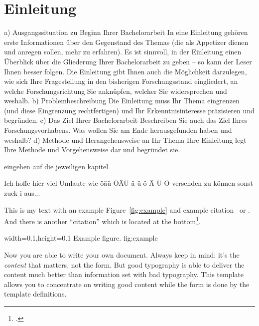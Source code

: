 
\chapter{Einleitung}

a) Ausgangssituation zu Beginn Ihrer Bachelorarbeit
In eine Einleitung gehören erste Informationen über den Gegenstand des Themas (die als Appetizer dienen und anregen sollen, mehr zu erfahren). Es ist sinnvoll, in der Einleitung einen Überblick über die Gliederung Ihrer Bachelorarbeit zu geben – so kann der Leser Ihnen besser folgen. Die Einleitung gibt Ihnen auch die Möglichkeit darzulegen, wie sich Ihre Fragestellung in den bisherigen Forschungsstand eingliedert, an welche Forschungsrichtung Sie anknüpfen, welcher Sie widersprechen und weshalb.
b) Problembeschreibung
Die Einleitung muss Ihr Thema eingrenzen (und diese Eingrenzung rechtfertigen) und Ihr Erkenntnisinteresse präzisieren und begründen.
c) Das Ziel Ihrer Bachelorarbeit
Beschreiben Sie auch das Ziel Ihres Forschungsvorhabens. Was wollen Sie am Ende herausgefunden haben und weshalb?
d) Methode und Herangehensweise an Ihr Thema
Ihre Einleitung legt Ihre Methode und Vorgehensweise dar und begründet sie.

eingehen auf die jeweiligen kapitel

Ich hoffe hier viel Umlaute wie öäü ÖÄÜ ä ü ö Ä Ü Ö versenden zu können sonst zuck i aus...



This is my text with an example Figure~\ref{fig:example} and example
citation~\cite{StrunkWhite} or \textcite{Bringhurst1993}. And there is another
\enquote{citation} which is located at the bottom\footcite{tagstore}.

  {width=0.1\textwidth,height=0.1\textheight}%
  {Example figure.}%
  {}%
  {fig:example}%

Now you are able to write your own document. Always keep in mind: it's
the \emph{content} that matters, not the form. But good typography is
able to deliver the content much better than information set with bad
typography. This template allows you to concentrate on writing good
content while the form is done by the template definitions.


